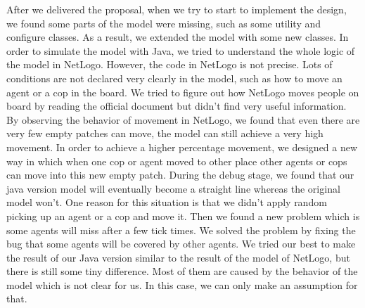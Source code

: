After we delivered the proposal, when we try to start to implement the design, we found
some parts of the model were missing, such as some utility and configure classes. As a result, we extended the model with some new classes. In order to simulate the model with Java, we tried to understand the whole logic of the model in NetLogo. However, the code in NetLogo is not precise. Lots of conditions are not declared very clearly in the model, such as how to move an agent or a cop in the board. We tried to figure out how NetLogo moves people on board by reading the official document but didn’t find very useful information. By observing the behavior of movement in NetLogo, we found that even there are very few empty patches can move, the model can still achieve a very high movement. In order to achieve a higher percentage movement, we designed a new way in which when one cop or agent moved to other place other
agents or cops can move into this new empty patch. During the debug stage, we found that our java version model will eventually become a straight line whereas the original model won’t. One reason for this situation is that we didn’t apply random picking up an agent or a cop and move it. Then we found a new problem which is some agents will miss after a few tick times. We solved
the problem by fixing the bug that some agents will be covered by other agents. We tried our best to make the result of our Java version similar to the result of the model of NetLogo, but there is still some tiny difference. Most of them are caused by the behavior of the model which is not clear for us. In this case, we can only make an assumption for that.